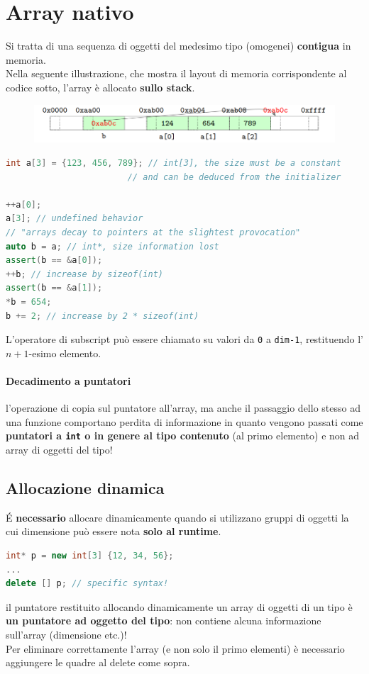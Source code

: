\documentclass[10pt, oneside]{book}
\begin{document}
\section{Array nativo}
Si tratta di una sequenza di oggetti del medesimo tipo (omogenei) \textbf{contigua} in memoria.\\
Nella seguente illustrazione, che mostra il layout di memoria corrispondente al codice sotto, l'array è allocato \textbf{sullo stack}.
\begin{figure}[h!]
\centering
\includegraphics[scale=0.63]{array.png}
\end{figure}
\begin{lstlisting}[language=C++]
int a[3] = {123, 456, 789}; // int[3], the size must be a constant
				        // and can be deduced from the initializer

++a[0];
a[3]; // undefined behavior
// "arrays decay to pointers at the slightest provocation"
auto b = a; // int*, size information lost
assert(b == &a[0]);
++b; // increase by sizeof(int)
assert(b == &a[1]);
*b = 654;
b += 2; // increase by 2 * sizeof(int)
\end{lstlisting}
L'operatore di subscript può essere chiamato su valori da \texttt{0} a \texttt{dim-1}, restituendo l'$n+1$-esimo elemento.
\paragraph{Decadimento a puntatori} l'operazione di copia sul puntatore all'array, ma anche il passaggio dello stesso ad una funzione comportano perdita di informazione in quanto vengono passati come \textbf{puntatori a \texttt{int} o in genere al tipo contenuto} (al primo elemento) e non ad array di oggetti del tipo!

\subsection{Allocazione dinamica}
\'E \textbf{necessario} allocare dinamicamente quando si utilizzano gruppi di oggetti la cui dimensione può essere nota \textbf{solo al runtime}.
\begin{lstlisting}[language=C++]
int* p = new int[3] {12, 34, 56};
...
delete [] p; // specific syntax!
\end{lstlisting}
il puntatore restituito allocando dinamicamente un array di oggetti di un tipo è \textbf{un puntatore ad oggetto del tipo}: non contiene alcuna informazione sull'array (dimensione etc.)!\\
Per eliminare correttamente l'array (e non solo il primo elementi) è necessario aggiungere le quadre al delete come sopra.
\end{document}
